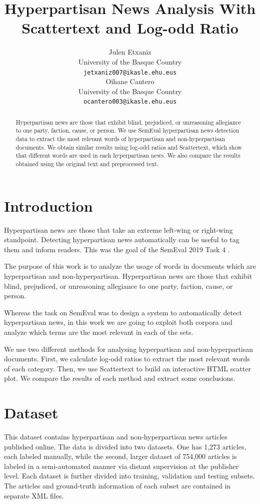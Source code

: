 \documentclass[11pt,a4paper]{article}
\title{Hyperpartisan News Analysis With Scattertext and Log-odd Ratio}
\author{Julen Etxaniz \\
  University of the Basque Country \\
  \texttt{jetxaniz007@ikasle.ehu.eus} \\\And
  Oihane Cantero \\
  University of the Basque Country \\
  \texttt{ocantero003@ikasle.ehu.eus} \\}
\date{}
\begin{document}
\maketitle
\begin{abstract}
Hyperpartisan news are those that exhibit blind, prejudiced, or unreasoning allegiance to one party, faction, cause, or person. We use SemEval hyperpartisan news detection data to extract the most relevant words of hyperpartisan and non-hyperpartisan documents. We obtain similar results using log-odd ratios and Scattertext, which show that different words are used in each hyperpartisan news. We also compare the results obtained using the original text and preprocessed text.
\end{abstract}

\section{Introduction}

Hyperpartisan news are those that take an extreme left-wing or right-wing standpoint. Detecting hyperpartisan news automatically can be useful to tag them and inform readers. This was the goal of the SemEval 2019 Task 4 \cite{kiesel2019semeval}.

The purpose of this work is to analyze the usage of words in documents which are hyperpartisan and non-hyperpartisan. Hyperpartisan news are those that exhibit blind, prejudiced, or unreasoning allegiance to one party, faction, cause, or person.

Whereas the task on SemEval was to design a system to automatically detect hyperpartisan news, in this work we are going to exploit both corpora and analyze which terms are the most relevant in each of the sets.

We use two different methods for analysing hyperpartisan and non-hyperpartisan documents. First, we calculate log-odd ratios to extract the most relevant words of each category. Then, we use Scattertext \cite{kessler2017scattertext} to build an interactive HTML scatter plot. We compare the results of each method and extract some conclusions.

\section{Dataset}

This dataset contains hyperpartisan and non-hyperpartisan news articles published online. The data is divided into two datasets. One has 1,273 articles, each labeled manually, while the second, larger dataset of 754,000 articles is labeled in a semi-automated manner via distant supervision at the publisher level. Each dataset is further divided into training, validation and testing subsets. The articles and ground-truth information of each subset are contained in separate XML files.
\end{document}

